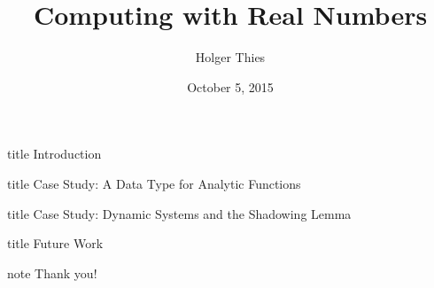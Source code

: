 \documentclass[xcolor=pdftex,dvipsnames,table]{beamer}
\title[Computing with Reals]{Computing with Real Numbers}
\author[ H. Thies]{
		Holger Thies 
}
\institute[The University of Tokyo]{
The University of Tokyo
}
\begin{document}
\date{October 5, 2015}
\frame{
\titlepage
}
\begin{frame}
	\begin{beamercolorbox}[sep=8pt,center,shadow=true,rounded=true]{title}
	Introduction\par%
    \end{beamercolorbox}
\vfill
\end{frame}

\begin{frame}
	\begin{beamercolorbox}[sep=8pt,center,shadow=true,rounded=true]{title}
	Case Study: A Data Type for Analytic Functions\par%
    \end{beamercolorbox}
\vfill
\end{frame}



\begin{frame}
	\begin{beamercolorbox}[sep=8pt,center,shadow=true,rounded=true]{title}
	Case Study: Dynamic Systems and the Shadowing Lemma\par%
    \end{beamercolorbox}
\vfill
\end{frame}

\begin{frame}
	\begin{beamercolorbox}[sep=8pt,center,shadow=true,rounded=true]{title}
	Future Work\par%
    \end{beamercolorbox}
\vfill
\end{frame}

\begin{frame}

    \vspace{\fill}
\begin{beamercolorbox}[center,shadow=true,rounded=true]{note} 
        \huge Thank you!
\end{beamercolorbox}

    \vspace{\fill}
\end{frame} 
\end{document}
